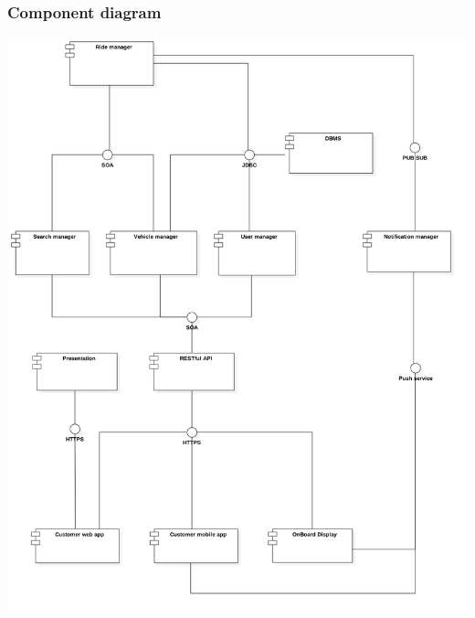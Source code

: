 \subsubsection{Component diagram}
\begin{center}
\includegraphics[scale=0.35]{Images/ComponentDiagram/ComponentDiagram.png}
\end{center}
\newpage
